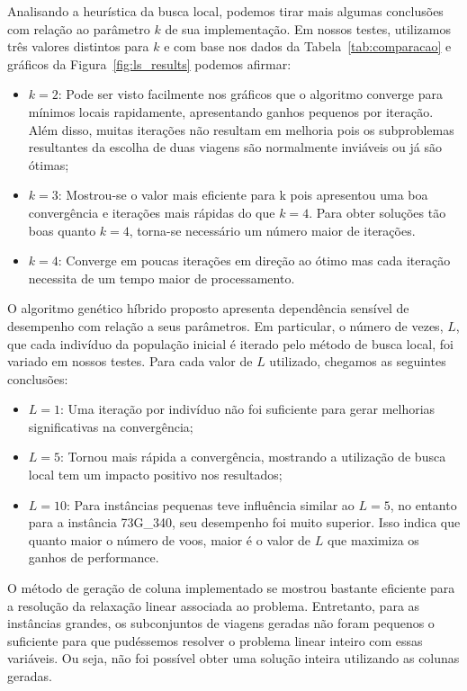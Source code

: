 Analisando a heurística da busca local, podemos tirar mais algumas conclusões com relação ao
parâmetro $k$ de sua implementação. Em nossos testes, utilizamos três valores distintos para $k$ 
e com base nos dados da Tabela~\ref{tab:comparacao} e gráficos da Figura~\ref{fig:ls_results} 
podemos afirmar:

\begin{itemize}
\item $k = 2$: Pode ser visto facilmente nos gráficos que o algoritmo converge para mínimos locais
rapidamente, apresentando ganhos pequenos por iteração. Além disso, muitas iterações não resultam em
melhoria pois os subproblemas resultantes da escolha de duas viagens são normalmente inviáveis ou já
são ótimas; 
\item $k = 3$: Mostrou-se o valor mais eficiente para k pois apresentou uma boa convergência e
iterações mais rápidas do que $k = 4$. Para obter soluções tão boas quanto $k = 4$, torna-se
necessário um número maior de iterações.
\item $k = 4$: Converge em poucas iterações em direção ao ótimo mas cada iteração necessita de um
tempo maior de processamento.
\end{itemize}

O algoritmo genético híbrido proposto apresenta dependência sensível de desempenho com relação a
seus parâmetros. Em particular, o número de vezes, $L$, que cada indivíduo da população inicial é
iterado pelo método de busca local, foi variado em nossos testes. Para cada valor de $L$ utilizado,
chegamos as seguintes conclusões:

\begin{itemize}
\item $L = 1$: Uma iteração por indivíduo não foi suficiente para gerar melhorias significativas na
convergência;
\item $L = 5$: Tornou mais rápida a convergência, mostrando a utilização de busca local tem um
impacto positivo nos resultados;
\item $L = 10$: Para instâncias pequenas teve influência similar ao $L = 5$, no entanto para a
instância 73G\_340, seu desempenho foi muito superior. Isso indica que quanto maior o número de
voos, maior é o valor de $L$ que maximiza os ganhos de performance.
\end{itemize}

O método de geração de coluna implementado se mostrou bastante eficiente para a resolução da
relaxação linear associada ao problema. Entretanto, para as instâncias grandes, os subconjuntos de
viagens geradas não foram pequenos o suficiente para que pudéssemos resolver o problema linear
inteiro com essas variáveis. Ou seja, não foi possível obter uma solução inteira utilizando as
colunas geradas.

